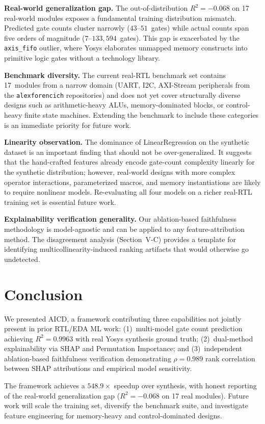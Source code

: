\documentclass[conference]{IEEEtran}
\begin{document}
\textbf{Real-world generalization gap.} The out-of-distribution
$R^2 = -0.068$ on 17 real-world modules exposes a fundamental training
distribution mismatch. Predicted gate counts cluster narrowly
($43$--$51$~gates) while actual counts span five orders of magnitude
($7$--$133{,}594$~gates). This gap is exacerbated by the \texttt{axis\_fifo}
outlier, where Yosys elaborates unmapped memory constructs into primitive
logic gates without a technology library.

\textbf{Benchmark diversity.} The current real-RTL benchmark set contains
17~modules from a narrow domain (UART, I2C, AXI-Stream peripherals from
the \texttt{alexforencich} repositories) and does not yet cover structurally
diverse designs such as arithmetic-heavy ALUs, memory-dominated blocks, or
control-heavy finite state machines. Extending the benchmark to include
these categories is an immediate priority for future work.

\textbf{Linearity observation.} The dominance of LinearRegression on the
synthetic dataset is an important finding that should not be over-generalized.
It suggests that the hand-crafted features already encode gate-count
complexity linearly for the synthetic distribution; however, real-world
designs with more complex operator interactions, parameterized macros, and
memory instantiations are likely to require nonlinear models. Re-evaluating
all four models on a richer real-RTL training set is essential future work.

\textbf{Explainability verification generality.} Our ablation-based
faithfulness methodology is model-agnostic and can be applied to any
feature-attribution method. The disagreement analysis (Section~V-C) provides
a template for identifying multicollinearity-induced ranking artifacts that
would otherwise go undetected.

\section{Conclusion}

We presented AICD, a framework contributing three capabilities not jointly
present in prior RTL/EDA ML work: (1)~multi-model gate count prediction
achieving $R^2 = 0.9963$ with real Yosys synthesis ground truth;
(2)~dual-method explainability via SHAP and Permutation Importance; and
(3)~independent ablation-based faithfulness verification demonstrating
$\rho = 0.989$ rank correlation between SHAP attributions and empirical
model sensitivity.

The framework achieves a $548.9\times$ speedup over synthesis, with honest
reporting of the real-world generalization gap ($R^2 = -0.068$ on 17 real
modules). Future work will scale the training set, diversify the benchmark
suite, and investigate feature engineering for memory-heavy and
control-dominated designs.



\end{document}
